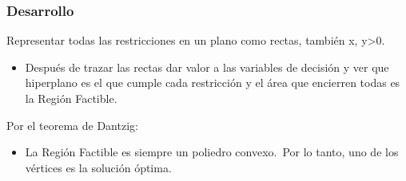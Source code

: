 \documentclass[12pt, twoside, openright]{report} %
\begin{document}
\subsubsection{Desarrollo}


Representar todas las restricciones en un plano como rectas,
también x, y\textgreater0.

\begin{itemize}
	\item Después de trazar las rectas dar valor a las variables de
	      decisión y ver que hiperplano es el que cumple cada restricción
	      y el área que encierren todas es la Región Factible.
\end{itemize}

Por el teorema de Dantzig:

\begin{itemize}
	\item La Región Factible es siempre un poliedro convexo.~Por lo tanto,
	      uno de los vértices es la solución óptima.
\end{itemize}
\end{document}
